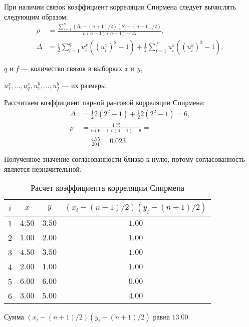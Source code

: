 При наличии связок коэффициент корреляции Спирмена следует вычислять следующим образом:
\begin{align*}
	\rho   & = \frac{\sum_{i=1}^n{(R_i-(n+1)/2)(S_i-(n+1)/2)}}{n(n-1)(n+1)-\Delta},                      \\
	\Delta & =\frac{1}{2}\sum_{l=1}^q{u_i^x((u_i^x)^2-1)+\frac{1}{2}\sum_{i=1}^{f}{u_i^y((u_i^y)^2-1)}},
\end{align*}
\begin{description}
	\item[где] $q$ и $f$ --- количество связок в выборках $x$ и $y$,
	\item $u^x_1, \ldots, u^x_q, u^y_1, \ldots, u^y_f$ --- их размеры.
\end{description}

Рассчитаем коэффициент парной ранговой корреляции Спирмена:
\begin{align*}
	\Delta & = \frac{1}{2} 2 (2^2-1) + \frac{1}{2} 2 (2^2-1) = 6, \\
	\rho   & = \frac{4.75}{6(6-1)(6+1)-6} =                       \\
	       & = \frac{4.75}{204} = 0.023.
\end{align*}

Полученное значение согласованности близко к нулю, потому согласованность является незначительной.

\begin{table}[H]
	\caption{Расчет коэффициента корреляции Спирмена}
	\label{tab:expert_spir2}
	\begin{tabular}{|c|c|c|c|}
		\hline
		$i$ & $x$    & $y$    & $(x_i-(n+1)/2)(y_i-(n+1)/2)$ \\ \hline
		1   & $4.50$ & $3.50$ & $1.00$                       \\ \hline
		2   & $1.00$ & $2.00$ & $1.00$                       \\ \hline
		3   & $4.50$ & $3.50$ & $1.00$                       \\ \hline
		4   & $2.00$ & $1.00$ & $1.00$                       \\ \hline
		5   & $6.00$ & $6.00$ & $0.00$                       \\ \hline
		6   & $3.00$ & $5.00$ & $4.00$                       \\ \hline
	\end{tabular}
\end{table}

Сумма $(x_i-(n+1)/2)(y_i-(n+1)/2)$ равна $13.00$.

